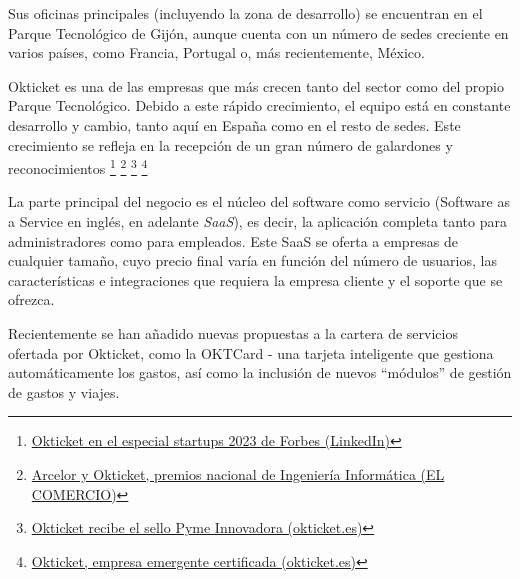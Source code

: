 Sus oficinas principales (incluyendo la zona de desarrollo) se encuentran en el Parque
Tecnológico de Gijón, aunque cuenta con un número de sedes creciente en varios países, como
Francia, Portugal o, más recientemente, México.

Okticket es una de las empresas que más crecen tanto del sector como del propio Parque
Tecnológico. Debido a este rápido crecimiento, el equipo está en constante desarrollo y
cambio, tanto aquí en España como en el resto de sedes. Este crecimiento se refleja
en la recepción de un gran número de galardones y reconocimientos
\footnote{\href{https://www.linkedin.com/posts/okticket_okticket-en-el-especial-startups-de-forbes-activity-7140622980618903552-UGWK}{Okticket en el especial startups 2023 de Forbes (LinkedIn)}}
\footnote{\href{https://www.elcomercio.es/economia/arcelor-okticket-premios-20230222002438-ntvo.html}{Arcelor y Okticket, premios nacional de Ingeniería Informática (EL COMERCIO)}}
\footnote{\href{https://www.okticket.es/blog/empresa-pyme-innovadora}{Okticket recibe el sello Pyme Innovadora (okticket.es)}}
\footnote{\href{https://www.okticket.es/blog/okticket-empresa-emergente-certificada}{Okticket, empresa emergente certificada (okticket.es)}}

La parte principal del negocio es el núcleo del software como servicio (Software as a
Service en inglés, en adelante \textit{SaaS}), es decir, la aplicación completa tanto
para administradores como para empleados. Este SaaS se oferta a empresas de cualquier
tamaño, cuyo precio final varía en función del número de usuarios, las características
e integraciones que requiera la empresa cliente y el soporte que se ofrezca.

Recientemente se han añadido nuevas propuestas a la cartera de servicios ofertada por
Okticket, como la OKTCard {-} una tarjeta inteligente que gestiona automáticamente los gastos,
así como la inclusión de nuevos ``módulos'' de gestión de gastos y viajes.
